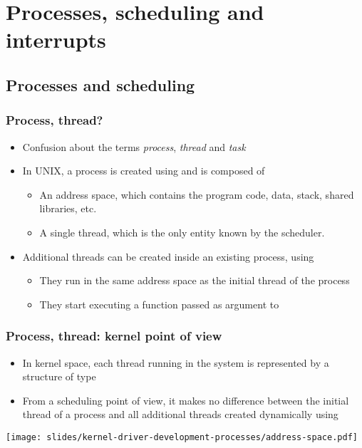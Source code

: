 \section{Processes, scheduling and interrupts}

\subsection{Processes and scheduling}

\begin{frame}
  \frametitle{Process, thread?}
  \begin{itemize}
  \item Confusion about the terms \emph{process}, \emph{thread} and
    \emph{task}
  \item In UNIX, a process is created using  and is
    composed of
    \begin{itemize}
    \item An address space, which contains the program code, data,
      stack, shared libraries, etc.
    \item A single thread, which is the only entity known by the scheduler.
    \end{itemize}
  \item Additional threads can be created inside an existing process,
    using 
    \begin{itemize}
    \item They run in the same address space as the initial thread of
      the process
    \item They start executing a function passed as argument to
    \end{itemize}
  \end{itemize}
\end{frame}

\begin{frame}
  \frametitle{Process, thread: kernel point of view}
  \begin{itemize}
  \item In kernel space, each thread running in the system is
    represented by a structure of type 
  \item From a scheduling point of view, it makes no difference
    between the initial thread of a process and all additional threads
    created dynamically using 
  \end{itemize}
  \begin{center}
    \texttt{[image: slides/kernel-driver-development-processes/address-space.pdf]}
  \end{center}
\end{frame}

